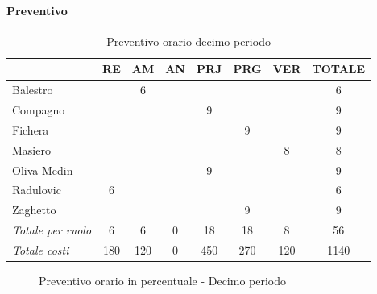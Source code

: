 \documentclass[a4paper,12pt]{article}
\begin{document}
            \paragraph{Preventivo}
                \begin{table}[H]
                \centering
                \caption{Preventivo orario decimo periodo}
                \begin{tabular}{|l|c|c|c|c|c|c|c|}
                \hline
                    \rowcolor{lightgray}{\textbf{Membro}} & {\textbf{RE}} & {\textbf{AM}} & {\textbf{AN}} & {\textbf{PRJ}} & {\textbf{PRG}} & {\textbf{VER}} & {\textbf{TOTALE}}\\
                \hline
                    Balestro & & 6 & & & & & 6\\
                \hline
                    Compagno & & & & 9 & & & 9\\
                \hline
                    Fichera & & & & & 9 & & 9\\
                \hline
                    Masiero & & & & & & 8 & 8\\
                \hline
                    Oliva Medin & & & & 9 & & & 9\\
                \hline
                    Radulovic & 6 & & & & & & 6\\
                \hline
                    Zaghetto & & & & & 9 & & 9\\
                \hline
                    \rowcolor{lightgray}\textit{Totale per ruolo} & 6 & 6 & 0 & 18 & 18 & 8 & 56\\
                \hline
                    \rowcolor{lightgray}\textit{Totale costi} & 180 & 120 & 0 & 450 & 270 & 120 & 1140\\
                \hline
                \end{tabular}
                \end{table}

                \begin{figure}[H]
                \centering
                \caption{Preventivo orario in percentuale - Decimo periodo}
                \end{figure}
                
\end{document}

